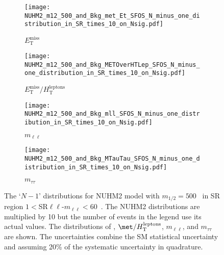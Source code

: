 \begin{figure}[htbp]
    \begin{center}
        \begin{subfigure}[b]{0.48\textwidth}
            \texttt{[image: NUHM2\_m12\_500\_and\_Bkg\_met\_Et\_SFOS\_N\_minus\_one\_distribution\_in\_SR\_times\_10\_on\_Nsig.pdf]}
            \caption{$E^{\mathrm{miss}}_{\mathrm{T}}$}
            \label{fig:event_nuhm2_m12_500_met_SFOS}
        \end{subfigure}
        \begin{subfigure}[b]{0.48\textwidth}
            \texttt{[image: NUHM2\_m12\_500\_and\_Bkg\_METOverHTLep\_SFOS\_N\_minus\_one\_distribution\_in\_SR\_times\_10\_on\_Nsig.pdf]}
            \caption{$E^{\mathrm{miss}}_{\mathrm{T}} / H^{\mathrm{leptons}}_{\mathrm{T}}$}
            \label{fig:event_nuhm2_m12_500_METOverHTLep_SFOS}
        \end{subfigure}
        \begin{subfigure}[b]{0.48\textwidth}
            \texttt{[image: NUHM2\_m12\_500\_and\_Bkg\_mll\_SFOS\_N\_minus\_one\_distribution\_in\_SR\_times\_10\_on\_Nsig.pdf]}
            \caption{$m_{\ell\ell}$}
            \label{fig:event_nuhm2_m12_500_mll_SFOS}
        \end{subfigure}
        \begin{subfigure}[b]{0.48\textwidth}
            \texttt{[image: NUHM2\_m12\_500\_and\_Bkg\_MTauTau\_SFOS\_N\_minus\_one\_distribution\_in\_SR\_times\_10\_on\_Nsig.pdf]}
            \caption{$m_{\tau\tau}$}
            \label{fig:event_nuhm2_m12_500_MTauTau_SFOS}
        \end{subfigure}
    \end{center}
    \caption{The `$N-1$' distributions for NUHM2 model with $m_{1/2} = 500$~{\GeV} in SR region $1 < $SR$\ell \ell$-$m_{\ell \ell} < 60$~{\GeV}.
    The NUHM2 distributions are multiplied by 10 but the number of events in the legend use its actual values.
    The distributions of \met, $\met/H_\mathrm{T}^\mathrm{leptons}$, $m_{\ell \ell}$, and $m_{\tau \tau}$ are shown.
    The uncertainties combine the SM statistical uncertainty and assuming 20\% of the systematic uncertainty in quadrature.}
    \label{fig:event_nuhm2_kinematic_in_SR_SFOS_2}
\end{figure}

